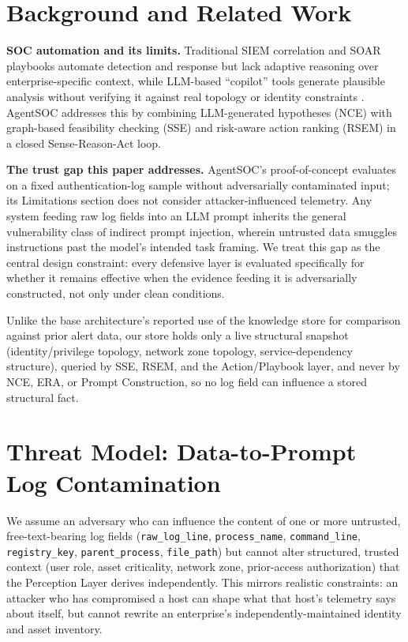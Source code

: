\documentclass[conference]{IEEEtran}
\begin{document}
\section{Background and Related Work}

\textbf{SOC automation and its limits.} Traditional SIEM correlation and SOAR playbooks automate detection and response but lack adaptive reasoning over enterprise-specific context, while LLM-based ``copilot'' tools generate plausible analysis without verifying it against real topology or identity constraints \cite{agentsoc}. AgentSOC \cite{agentsoc} addresses this by combining LLM-generated hypotheses (NCE) with graph-based feasibility checking (SSE) and risk-aware action ranking (RSEM) in a closed Sense-Reason-Act loop.

\textbf{The trust gap this paper addresses.} AgentSOC's proof-of-concept evaluates on a fixed authentication-log sample without adversarially contaminated input; its Limitations section does not consider attacker-influenced telemetry. Any system feeding raw log fields into an LLM prompt inherits the general vulnerability class of indirect prompt injection, wherein untrusted data smuggles instructions past the model's intended task framing. %
We treat this gap as the central design constraint: every defensive layer is evaluated specifically for whether it remains effective when the evidence feeding it is adversarially constructed, not only under clean conditions.

Unlike the base architecture's reported use of the knowledge store for comparison against prior alert data, our store holds only a live structural snapshot (identity/privilege topology, network zone topology, service-dependency structure), queried by SSE, RSEM, and the Action/Playbook layer, and never by NCE, ERA, or Prompt Construction, so no log field can influence a stored structural fact.

\section{Threat Model: Data-to-Prompt Log Contamination}

We assume an adversary who can influence the content of one or more untrusted, free-text-bearing log fields (\texttt{raw\_log\_line}, \texttt{process\_name}, \texttt{command\_line}, \texttt{registry\_key}, \texttt{parent\_process}, \texttt{file\_path}) but cannot alter structured, trusted context (user role, asset criticality, network zone, prior-access authorization) that the Perception Layer derives independently. This mirrors realistic constraints: an attacker who has compromised a host can shape what that host's telemetry says about itself, but cannot rewrite an enterprise's independently-maintained identity and asset inventory.
\end{document}
